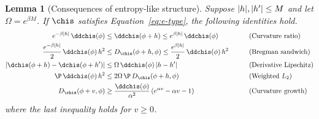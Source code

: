 \documentclass{article}
\newtheorem{lemma}[theorem]{Lemma}
\begin{document}
\begin{lemma}[Consequences of entropy-like structure]
\label{lem:e-type-bounds}
Suppose $\abs{h},\abs{h'} \le M$ and let $\Omega = e^{\beta M}$. If $\chis$ satisfies Equation~\ref{eq:e-type},
the following identities hold.
\begin{alignat}{2}
e^{-\beta|h|}\, \ddchis(\phi)
  &\le \ddchis(\phi + h)
  \le e^{\beta|h|}\, \ddchis(\phi)
  &&\qquad \textup{(Curvature ratio)}
  \label{eq:curvature-ratio-psc}\\
\frac{e^{-\beta|h|}}{2}\, \ddchis(\phi)\, h^2
  &\le D_{\chis}(\phi+h, \phi)
  \le \frac{e^{\beta|h|}}{2}\, \ddchis(\phi)\, h^2
  &&\qquad \textup{(Bregman sandwich)}
  \label{eq:bregman-sandwich}\\
|\dchis(\phi+h) - \dchis(\phi+h')|
  &\le \Omega\, \ddchis(\phi)\, |h - h'|
  &&\qquad \textup{(Derivative Lipschitz)}
  \label{eq:derivative-lipschitz}\\
\P\, \ddchis(\phi)\, h^2
  &\le 2\Omega\, \P\, D_{\chis}(\phi+h, \phi)
  &&\qquad \textup{(Weighted $L_2$)}
  \label{eq:weighted-l2-from-bregman}\\
D_{\chis}(\phi + v, \phi)
  &\ge \frac{\ddchis(\phi)}{\alpha^2}\,(e^{\alpha v} - \alpha v - 1)
  &&\qquad \textup{(Curvature growth)}
  \label{eq:curvature-growth-bregman}
\end{alignat}
where the last inequality holds for $v \ge 0$.
\end{lemma}
\end{document}

